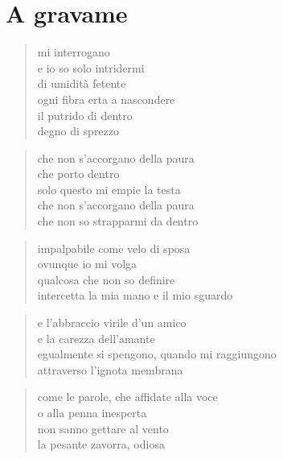 \chapter*{A gravame}


\begin{verse}
    mi interrogano\\
    e io so solo intridermi\\
    di umidità fetente\\
    ogni fibra erta a nascondere\\
    il putrido di dentro\\
    degno di sprezzo
\end{verse}

\begin{verse}
    che non s’accorgano della paura\\
    che porto dentro\\
    solo questo mi empie la testa\\
    che non s’accorgano della paura\\
    che non so strapparmi da dentro
\end{verse}

\clearpage


\begin{verse}
    impalpabile come velo di sposa\\
    ovunque io mi volga\\
    qualcosa che non so definire\\
    intercetta la mia mano e il mio sguardo
\end{verse}

\begin{verse}
    e l'abbraccio virile d'un amico\\
    e la carezza dell'amante\\
    egualmente si spengono, quando mi raggiungono\\
    attraverso l'ignota membrana
\end{verse}

\begin{verse}
    come le parole, che affidate alla voce\\
    o alla penna inesperta\\
    non sanno gettare al vento\\
    la pesante zavorra, odiosa
\end{verse}

